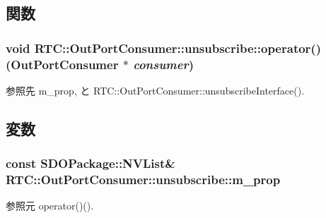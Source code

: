 \subsection{関数}
\subsubsection[{operator()}]{\setlength{\rightskip}{0pt plus 5cm}void RTC::OutPortConsumer::unsubscribe::operator() ({\bf OutPortConsumer} $\ast$ {\em consumer})\hspace{0.3cm}{\ttfamily  [inline]}}\label{structRTC_1_1OutPortConsumer_1_1unsubscribe_aa33d74f73e14a07703c004908460e531}


参照先 m\_\-prop, と RTC::OutPortConsumer::unsubscribeInterface().



\subsection{変数}
\subsubsection[{m\_\-prop}]{\setlength{\rightskip}{0pt plus 5cm}const SDOPackage::NVList\& {\bf RTC::OutPortConsumer::unsubscribe::m\_\-prop}}\label{structRTC_1_1OutPortConsumer_1_1unsubscribe_a70dacb1deb1131431955a193bd8ec07c}


参照元 operator()().

